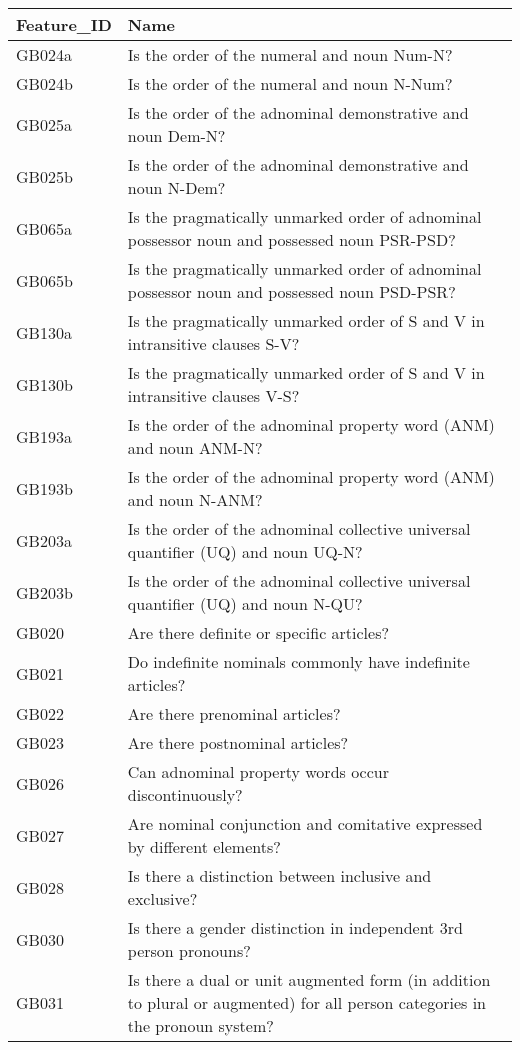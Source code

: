 \begin{longtable}{p{3cm}p{12cm}}
  \toprule
Feature_ID & Name \\ 
  \midrule
GB024a & Is the order of the numeral and noun Num-N? \\ 
  GB024b & Is the order of the numeral and noun N-Num? \\ 
  GB025a & Is the order of the adnominal demonstrative and noun Dem-N? \\ 
  GB025b & Is the order of the adnominal demonstrative and noun N-Dem? \\ 
  GB065a & Is the pragmatically unmarked order of adnominal possessor noun and possessed noun PSR-PSD? \\ 
  GB065b & Is the pragmatically unmarked order of adnominal possessor noun and possessed noun PSD-PSR? \\ 
  GB130a & Is the pragmatically unmarked order of S and V in intransitive clauses S-V? \\ 
  GB130b & Is the pragmatically unmarked order of S and V in intransitive clauses V-S? \\ 
  GB193a & Is the order of the adnominal property word (ANM) and noun ANM-N? \\ 
  GB193b & Is the order of the adnominal property word (ANM) and noun N-ANM? \\ 
  GB203a & Is the order of the adnominal collective universal quantifier (UQ) and noun UQ-N? \\ 
  GB203b & Is the order of the adnominal collective universal quantifier (UQ) and noun N-QU? \\ 
  GB020 & Are there definite or specific articles? \\ 
  GB021 & Do indefinite nominals commonly have indefinite articles? \\ 
  GB022 & Are there prenominal articles? \\ 
  GB023 & Are there postnominal articles? \\ 
  GB026 & Can adnominal property words occur discontinuously? \\ 
  GB027 & Are nominal conjunction and comitative expressed by different elements? \\ 
  GB028 & Is there a distinction between inclusive and exclusive? \\ 
  GB030 & Is there a gender distinction in independent 3rd person pronouns? \\ 
  GB031 & Is there a dual or unit augmented form (in addition to plural or augmented) for all person categories in the pronoun system? \\ 

\end{longtable}
